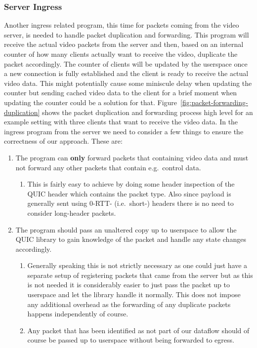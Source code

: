 \subsubsection{Server Ingress}
Another ingress related program, this time for packets coming from the video server, is needed
to handle packet duplication and forwarding.
This program will receive the actual video packets from the server and then, based on an internal 
counter of how many clients actually want to receive the video, duplicate the packet accordingly.
The counter of clients will be updated by the userspace once a new connection is fully established
and the client is ready to receive the actual video data.
This might potentially cause some miniscule delay when updating the counter but sending cached 
video data to the client for a brief moment when updating the counter could be a solution for that. %
Figure~\ref{fig:packet-forwarding-duplication} shows the packet duplication and forwarding process 
high level for an example setting with three clients that want to receive the video data.
In the ingress program from the server we need to consider a few things to ensure the correctness
of our approach.
These are:
\begin{enumerate}
    \item   The program can \textbf{only} forward packets that containing video data and must not 
            forward any other packets that contain e.g.~control data.
    \begin{enumerate}
        \item   This is fairly easy to achieve by doing some header inspection of the QUIC header
                which contains the packet type. Also since payload is generally sent using 
                0-RTT- (i.e.~short-) headers there is no need to consider long-header packets.
    \end{enumerate}

    \item   The program should pass an unaltered copy up to userspace to allow the QUIC library to
            gain knowledge of the packet and handle any state changes accordingly.
    \begin{enumerate}
        \item   Generally speaking this is not strictly necessary as one could just have a separate 
                setup of registering packets that came from the server but as this is not needed
                it is considerably easier to just pass the packet up to userspace and let the 
                library handle it normally. This does not impose any additional overhead as the
                forwarding of any duplicate packets happens independently of course.
        \item   Any packet that has been identified as not part of our dataflow should of course 
                be passed up to userspace without being forwarded to egress.
    \end{enumerate}
\end{enumerate}

